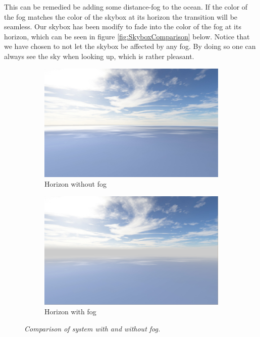 This can be remedied be adding some distance-fog to the ocean. If the color of the fog matches the color of the skybox at its horizon the transition will be seamless. Our skybox has been modify to fade into the color of the fog at its horizon, which can be seen in figure \ref{fig:SkyboxComparison} below. Notice that we have chosen to not let the skybox be affected by any fog. By doing so one can always see the sky when looking up, which is rather pleasant. 

\begin{figure}[H]
\begin{subfigure}{.5\textwidth}
  \centering
  \includegraphics[width=0.9\linewidth]{images/horizonNoFog.jpg}
  \caption{Horizon without fog}
  \label{fig:HorizonNoFog}
\end{subfigure}%
\begin{subfigure}{.5\textwidth}
  \centering
  \includegraphics[width=0.9\linewidth]{images/horizonFog.jpg}
  \caption{Horizon with fog}
  \label{fig:HorizonFog}
\end{subfigure}
\caption[Fog Comparison]{\textit{Comparison of system with and without fog.}}
\label{fig:HorizonFogComparison}
\end{figure}

